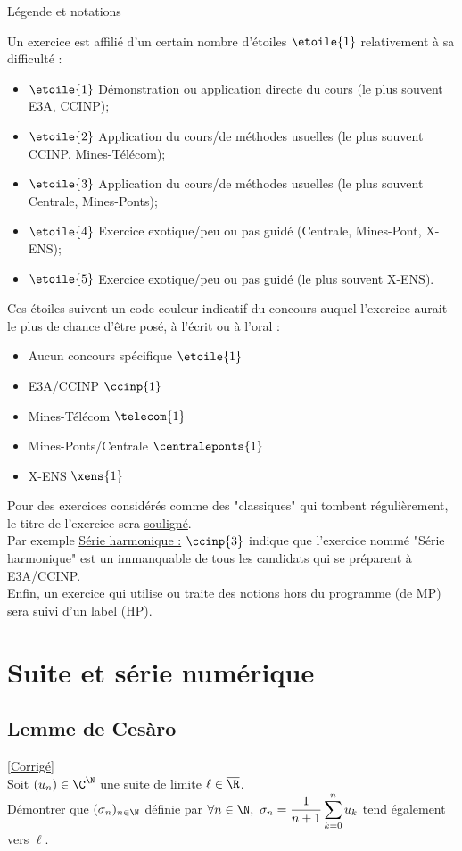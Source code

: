 \documentclass{book}
\begin{document}
	\newpage
	\begin{center}\large{Légende et notations}\end{center}
	Un exercice est affilié d'un certain nombre d'étoiles $\etoile{1}$ relativement à sa difficulté :\\
	\begin{itemize}
		\item $\etoile{1}$ Démonstration ou application directe du cours (le plus souvent E3A, CCINP);
		\item $\etoile{2}$ Application du cours/de méthodes usuelles (le plus souvent CCINP, Mines-Télécom);
		\item $\etoile{3}$ Application du cours/de méthodes usuelles (le plus souvent Centrale, Mines-Ponts);
		\item $\etoile{4}$ Exercice exotique/peu ou pas guidé (Centrale, Mines-Pont, X-ENS);
		\item $\etoile{5}$ Exercice exotique/peu ou pas guidé (le plus souvent X-ENS).
	\end{itemize}
	Ces étoiles suivent un code couleur indicatif du concours auquel l'exercice aurait le plus de chance d'être posé, à l'écrit ou à l'oral :
	\begin{itemize}
		\item Aucun concours spécifique $\etoile{1}$
		\item E3A/CCINP $\ccinp{1}$
		\item Mines-Télécom $\telecom{1}$
		\item Mines-Ponts/Centrale $\centraleponts{1}$
		\item X-ENS $\xens{1}$
	\end{itemize}
	Pour des exercices considérés comme des "classiques" qui tombent régulièrement, le titre de l'exercice sera \underline{souligné}.\\
	Par exemple \underline{Série harmonique :} $\ccinp{3}$ indique que l'exercice nommé "Série harmonique" est un immanquable de tous les candidats qui se préparent à E3A/CCINP.\\
	Enfin, un exercice qui utilise ou traite des notions hors du programme (de MP) sera suivi d'un label (HP).
	
	\setcounter{tocdepth}{1}
	\tableofcontents

\chapter{Suite et série numérique}
	\section{Lemme de Cesàro } 
	\textcolor{blue}{\hyperref[Lemme de Cesàro corrigé]{[Corrigé]}}\\
	\label{Lemme de Cesàro}
	Soit $(u_n)\in \C^\N$ une suite de limite $\ell\in \overline{\R}$.\\
	Démontrer que $(\sigma_n)_{n\in \N}$ définie par $\forall n\in \N,\ \sigma_n=\displaystyle\frac{1}{n+1}\sum_{k=0}^nu_k$ tend également vers $\ell$.
	
\end{document}
